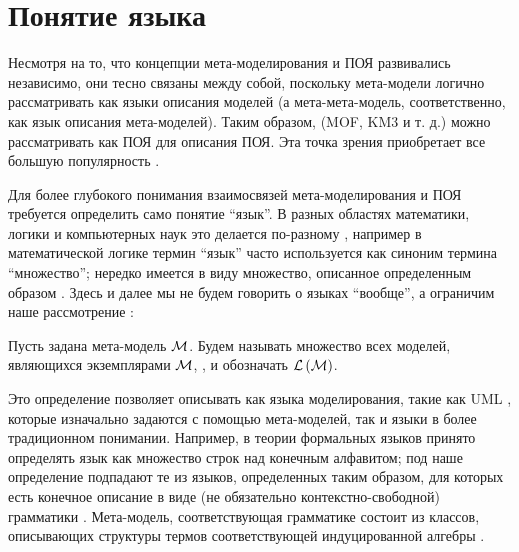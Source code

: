 \chapter{Понятие языка}

Несмотря на то, что концепции мета-моделирования и ПОЯ развивались независимо, они тесно связаны между собой, поскольку мета-модели логично рассматривать как языки описания моделей (а мета-мета-модель, соответственно, как язык описания мета-моделей). Таким образом,  (MOF, KM3 и т. д.) можно рассматривать как ПОЯ для описания ПОЯ. Эта точка зрения приобретает все большую популярность \cite{}.

Для более глубокого понимания взаимосвязей мета-моделирования и ПОЯ требуется определить само понятие ``язык''. В разных областях математики, логики и компьютерных наук это делается по-разному \cite{???}, например в математической логике термин ``язык'' часто используется как синоним термина ``множество''; нередко имеется в виду множество, описанное определенным образом \cite{}. Здесь и далее мы не будем говорить о языках ``вообще'', а ограничим наше рассмотрение :

\newcommand{\Lang}[1]{\mathcal{L}\left(#1\right)}%
\newcommand{\LMM}[1]{\Lang{\MM{#1}}}%

\begin{Def}
Пусть задана мета-модель $\mathcal{M}$. Будем называть множество всех моделей, являющихся экземплярами $\mathcal{M}$, , и обозначать $\Lang{\MM{M}}$.
\end{Def}

Это определение позволяет описывать как языка моделирования, такие как UML \cite{???}, которые изначально задаются с помощью мета-моделей, так и языки в более традиционном понимании. Например, в теории формальных языков \cite{???} принято определять язык как множество строк над конечным алфавитом; под наше определение подпадают те из языков, определенных таким образом, для которых есть конечное описание в виде (не обязательно контекстно-свободной) грамматики \cite{???}. Мета-модель, соответствующая грамматике состоит из классов, описывающих структуры термов соответствующей индуцированной алгебры \cite{???}.

